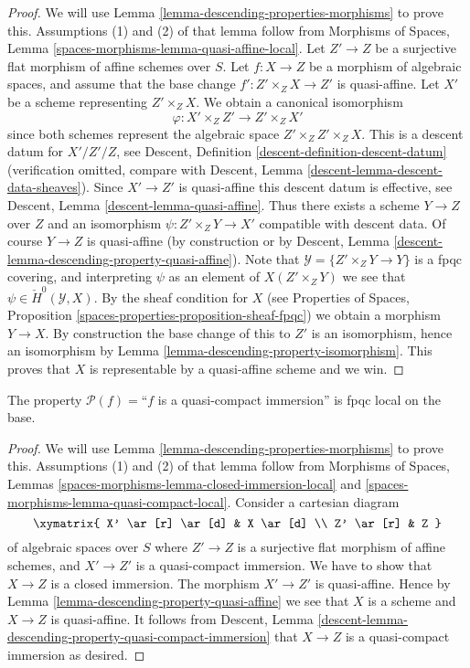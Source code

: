 \begin{proof}
We will use
Lemma \ref{lemma-descending-properties-morphisms}
to prove this. Assumptions (1) and (2) of that lemma follow from
Morphisms of Spaces,
Lemma \ref{spaces-morphisms-lemma-quasi-affine-local}.
Let $Z' \to Z$ be a surjective flat morphism of affine schemes over $S$.
Let $f : X \to Z$ be a morphism of algebraic spaces, and assume
that the base change $f' : Z' \times_Z X \to Z'$ is quasi-affine.
Let $X'$ be a scheme representing $Z' \times_Z X$.
We obtain a canonical isomorphism
$$
\varphi : X' \times_Z Z' \longrightarrow Z' \times_Z X'
$$
since both schemes represent the algebraic space $Z' \times_Z Z' \times_Z X$.
This is a descent datum for $X'/Z'/Z$, see
Descent, Definition \ref{descent-definition-descent-datum}
(verification omitted, compare with
Descent, Lemma \ref{descent-lemma-descent-data-sheaves}).
Since $X' \to Z'$ is quasi-affine this descent datum is effective, see
Descent, Lemma \ref{descent-lemma-quasi-affine}.
Thus there exists a scheme $Y \to Z$ over $Z$ and an
isomorphism $\psi : Z' \times_Z Y \to X'$ compatible with descent data.
Of course $Y \to Z$ is quasi-affine (by construction or by
Descent, Lemma \ref{descent-lemma-descending-property-quasi-affine}).
Note that $\mathcal{Y} = \{Z' \times_Z Y \to Y\}$ is a
fpqc covering, and interpreting $\psi$ as an element of
$X(Z' \times_Z Y)$ we see that $\psi \in \check{H}^0(\mathcal{Y}, X)$.
By the sheaf condition for $X$ (see
Properties of Spaces, Proposition
\ref{spaces-properties-proposition-sheaf-fpqc})
we obtain a morphism $Y \to X$.
By construction the base change of this to $Z'$ is an isomorphism, hence
an isomorphism by
Lemma \ref{lemma-descending-property-isomorphism}.
This proves that $X$ is representable by a quasi-affine scheme and we win.
\end{proof}

\begin{lemma}
\label{lemma-descending-property-quasi-compact-immersion}
The property $\mathcal{P}(f) =$``$f$ is a quasi-compact immersion''
is fpqc local on the base.
\end{lemma}

\begin{proof}
We will use
Lemma \ref{lemma-descending-properties-morphisms}
to prove this. Assumptions (1) and (2) of that lemma follow from
Morphisms of Spaces,
Lemmas \ref{spaces-morphisms-lemma-closed-immersion-local} and
\ref{spaces-morphisms-lemma-quasi-compact-local}.
Consider a cartesian diagram
$$
\xymatrix{
X' \ar[r] \ar[d] & X \ar[d] \\
Z' \ar[r] & Z
}
$$
of algebraic spaces over $S$
where $Z' \to Z$ is a surjective flat morphism of affine schemes,
and $X' \to Z'$ is a quasi-compact immersion. We have to show that $X \to Z$
is a closed immersion. The morphism $X' \to Z'$ is quasi-affine. Hence by
Lemma \ref{lemma-descending-property-quasi-affine}
we see that $X$ is a scheme and $X \to Z$ is quasi-affine.
It follows from
Descent, Lemma \ref{descent-lemma-descending-property-quasi-compact-immersion}
that $X \to Z$ is a quasi-compact immersion as desired.
\end{proof}

